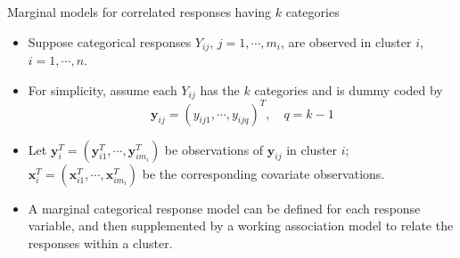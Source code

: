 \documentclass{beamer}
\newenvironment{wideitemize}%
  {\begin{itemize}%
    \setlength{\parskip}{1em}}%
  {\end{itemize}}
\begin{document}
%
\begin{frame}{\large Marginal models for correlated responses having $k$ categories}
\begin{wideitemize}
\item
Suppose categorical responses $Y_{ij}$, $j=1,\cdots, m_i$, are observed in cluster $i$, $i=1,\cdots,n$.
\item
For simplicity, assume each $Y_{ij}$ has the $k$ categories and is dummy coded by
$$\textbf{y}_{ij}=(y_{ij1}, \cdots, y_{ijq})^T, \quad q=k-1$$
\item
Let $\textbf{y}_i^T=(\textbf{y}_{i1}^T, \cdots, \textbf{y}_{im_i}^T)$ be observations of $\textbf{y}_{ij}$
in cluster $i$; $\textbf{x}_i^T=(\textbf{x}_{i1}^T, \cdots, \textbf{x}_{im_i}^T)$ be the corresponding
covariate observations.
\item
A marginal categorical response model can be defined
for each response variable, and then supplemented by a working association model to relate  the
responses  within a  cluster.


\end{wideitemize}
\end{frame}
\end{document}
